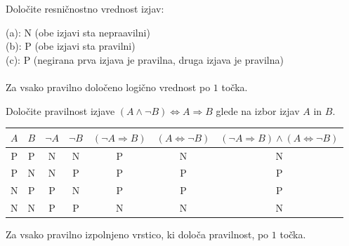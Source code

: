 \documentclass[addpoints,12pt]{exam}
\begin{document}
\begin{questions}


    \question[3]
    Določite resničnostno vrednost izjav:

    \begin{solution}
        (a): N (obe izjavi sta nepraavilni) \\
        (b): P (obe izjavi sta pravilni) \\
        (c): P (negirana prva izjava je pravilna, druga izjava je pravilna) \\ \\
        Za vsako pravilno določeno logično vrednost po $1$ točka.
    \end{solution}


  \newpage
    
    \question[4]
    Določite pravilnost izjave $( A \land  \lnot B)\Leftrightarrow A\Rightarrow  B$ glede na izbor izjav $A$ in $B$.

    \begin{solution}[12cm]
        \begin{table}[H]
            \begin{tabular}{ccccccc}
             $A$ & $B$ & $\lnot A$ & $\lnot B$ & $(\lnot A\Rightarrow B)$ & $(A\Leftrightarrow \lnot B)$ & $(\lnot A\Rightarrow B)\land(A\Leftrightarrow \lnot B)$\\ \hline
             P & P & N & N & P & N & N \\ 
             P & N & N & P & P & P & P \\
             N & P & P & N & P & P & P \\
             N & N & P & P & N & N & N
            \end{tabular}
        \end{table}
        Za vsako pravilno izpolnjeno vrstico, ki določa pravilnost, po $1$ točka.
    \end{solution}







\end{questions}
\end{document}
